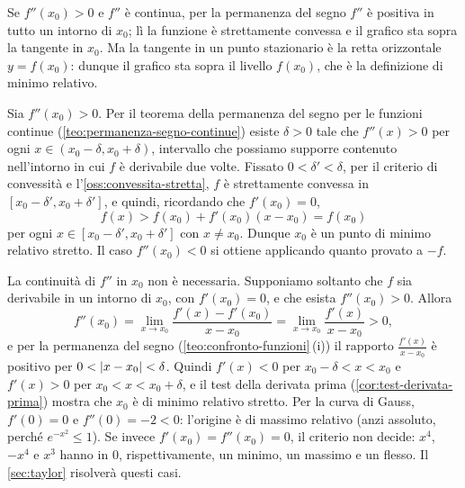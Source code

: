 \begin{schema}
\end{schema}

\begin{strategia}
Se $f''(x_{0})>0$ e $f''$ è continua, per la permanenza del segno $f''$ è positiva in
tutto un intorno di $x_{0}$; lì la funzione è strettamente convessa e il grafico sta
sopra la tangente in $x_{0}$. Ma la tangente in un punto stazionario è la retta
orizzontale $y=f(x_{0})$: dunque il grafico sta sopra il livello $f(x_{0})$, che è la
definizione di minimo relativo.
\end{strategia}

\begin{dimostrazione}
Sia $f''(x_{0})>0$. Per il teorema della permanenza del segno per le funzioni continue
(\cref{teo:permanenza-segno-continue}) esiste $\delta>0$ tale che $f''(x)>0$ per ogni
$x\in(x_{0}-\delta,x_{0}+\delta)$, intervallo che possiamo supporre contenuto
nell'intorno in cui $f$ è derivabile due volte. Fissato $0<\delta'<\delta$, per il
criterio di convessità e l'\cref{oss:convessita-stretta}, $f$ è strettamente convessa in
$[x_{0}-\delta',x_{0}+\delta']$, e quindi, ricordando che $f'(x_{0})=0$,
\begin{equation}\label{eq:test-derivata-seconda-dim}
  f(x)>f(x_{0})+f'(x_{0})(x-x_{0})=f(x_{0})
\end{equation}
per ogni $x\in[x_{0}-\delta',x_{0}+\delta']$ con $x\neq x_{0}$.
Dunque $x_{0}$ è un punto di minimo relativo stretto. Il caso $f''(x_{0})<0$ si ottiene
applicando quanto provato a $-f$.
\end{dimostrazione}

\begin{osservazione}\label{oss:test-derivata-seconda}
La continuità di $f''$ in $x_{0}$ non è necessaria. Supponiamo soltanto che $f$ sia
derivabile in un intorno di $x_{0}$, con $f'(x_{0})=0$, e che esista $f''(x_{0})>0$.
Allora
\[
  f''(x_{0})=\lim_{x\to x_{0}}\frac{f'(x)-f'(x_{0})}{x-x_{0}}=\lim_{x\to x_{0}}\frac{f'(x)}{x-x_{0}}>0,
\]
e per la permanenza del segno (\cref{teo:confronto-funzioni}\,(i)) il rapporto
$\frac{f'(x)}{x-x_{0}}$ è positivo per $0<\lvert x-x_{0}\rvert<\delta$. Quindi $f'(x)<0$ per
$x_{0}-\delta<x<x_{0}$ e $f'(x)>0$ per $x_{0}<x<x_{0}+\delta$, e il test della derivata
prima (\cref{cor:test-derivata-prima}) mostra che $x_{0}$ è di minimo relativo stretto.
Per la curva di Gauss, $f'(0)=0$ e $f''(0)=-2<0$: l'origine è di massimo relativo
(anzi assoluto, perché $e^{-x^{2}}\le1$). Se invece $f'(x_{0})=f''(x_{0})=0$, il criterio
non decide: $x^{4}$, $-x^{4}$ e $x^{3}$ hanno in $0$, rispettivamente, un minimo, un
massimo e un flesso. Il \cref{sec:taylor} risolverà questi casi.
\end{osservazione}

